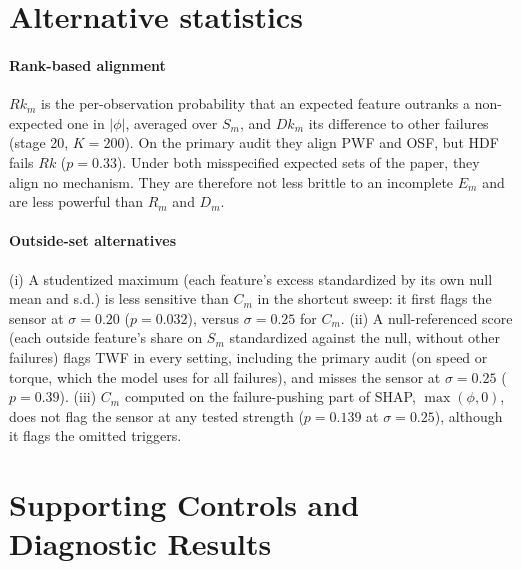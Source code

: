 \documentclass[10pt]{article}
\begin{document}
\section{Alternative statistics}
\label{sec:alternatives}

\paragraph{Rank-based alignment} $Rk_m$ is the per-observation probability that an expected feature outranks a non-expected one in $|\phi|$, averaged over $S_m$, and $Dk_m$ its difference to other failures (stage 20, $K=200$). On the primary audit they align PWF and OSF, but HDF fails $Rk$ ($p=0.33$). Under both misspecified expected sets of the paper, they align no mechanism. They are therefore not less brittle to an incomplete $E_m$ and are less powerful than $R_m$ and $D_m$.

\paragraph{Outside-set alternatives} (i) A studentized maximum (each feature's excess standardized by its own null mean and s.d.) is less sensitive than $C_m$ in the shortcut sweep: it first flags the sensor at $\sigma=0.20$ ($p=0.032$), versus $\sigma=0.25$ for $C_m$. (ii) A null-referenced score (each outside feature's share on $S_m$ standardized against the null, without other failures) flags TWF in every setting, including the primary audit (on speed or torque, which the model uses for all failures), and misses the sensor at $\sigma=0.25$ ($p=0.39$). (iii) $C_m$ computed on the failure-pushing part of SHAP, $\max(\phi,0)$, does not flag the sensor at any tested strength ($p=0.139$ at $\sigma=0.25$), although it flags the omitted triggers.

\section{Supporting Controls and Diagnostic Results}
\label{sec:diagnostics}
\end{document}
